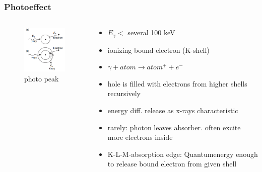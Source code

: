 \documentclass[aspectratio=1610, 9pt]{beamer}
\begin{document}
\begin{frame}\frametitle{Photoeffect}
  \begin{columns}
    \begin{column}[c]{0.48\textwidth}
      \begin{figure}
        \includegraphics[width=\textwidth]{plots/photo_abs.png}
        \caption{photo peak}
      \end{figure}
    \end{column}
    \begin{column}[c]{0.48\textwidth}
      \begin{itemize}
        \item $E_\gamma < $ several 100 keV
        \item ionizing bound electron (K-shell)
        \item $\gamma + atom \to atom^{+} + e^{-}$
        \item hole is filled with electrons from higher shells recursively
        \item energy diff. release as x-rays characteristic
        \item rarely: photon leaves absorber. often excite more electrons inside
        \item K-L-M-absorption edge: Quantumenergy enough to release bound electron from given shell
      \end{itemize}
    \end{column}
  \end{columns}
\end{frame}
\end{document}

